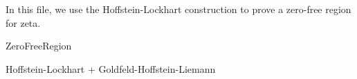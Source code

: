 

In this file, we use the Hoffstein-Lockhart construction to prove a zero-free region for zeta.

ZeroFreeRegion

Hoffstein-Lockhart + Goldfeld-Hoffstein-Liemann



